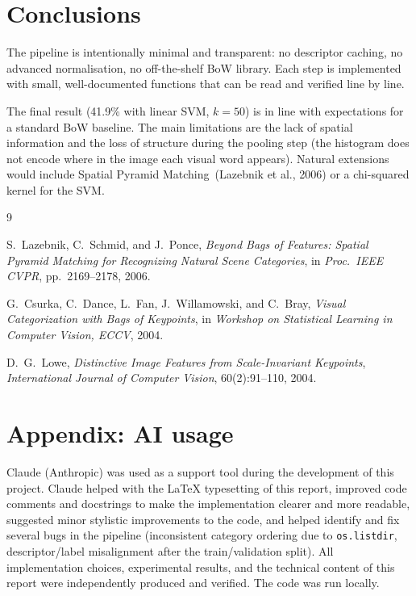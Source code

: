 \documentclass[11pt, a4paper]{article}
\begin{document}
\section{Conclusions}

The pipeline is intentionally minimal and transparent: no descriptor
caching, no advanced normalisation, no off-the-shelf BoW library. Each
step is implemented with small, well-documented functions that can be
read and verified line by line.

The final result (41.9\% with linear SVM, $k{=}50$) is in line with
expectations for a standard BoW baseline. The main limitations are the
lack of spatial information and the loss of structure during the
pooling step (the histogram does not encode where in the image each
visual word appears). Natural extensions would include Spatial Pyramid
Matching~(Lazebnik et al., 2006) or a chi-squared kernel for the SVM.

\begin{thebibliography}{9}

S.~Lazebnik, C.~Schmid, and J.~Ponce,
\textit{Beyond Bags of Features: Spatial Pyramid Matching for
Recognizing Natural Scene Categories},
in \textit{Proc.\ IEEE CVPR}, pp.~2169--2178, 2006.

G.~Csurka, C.~Dance, L.~Fan, J.~Willamowski, and C.~Bray,
\textit{Visual Categorization with Bags of Keypoints},
in \textit{Workshop on Statistical Learning in Computer Vision,
ECCV}, 2004.

D.~G.~Lowe,
\textit{Distinctive Image Features from Scale-Invariant Keypoints},
\textit{International Journal of Computer Vision},
60(2):91--110, 2004.

\end{thebibliography}

\appendix
\section*{Appendix: AI usage}

Claude (Anthropic) was used as a support
tool during the development of this project. Claude helped with the
\LaTeX{} typesetting of this report, improved code comments and
docstrings to make the implementation clearer and more readable,
suggested minor stylistic improvements to the code, and helped
identify and fix several bugs in the pipeline (inconsistent category
ordering due to \texttt{os.listdir}, descriptor/label misalignment
after the train/validation split). All implementation choices,
experimental results, and the technical content of this report were
independently produced and verified. The code was run locally.
\end{document}
